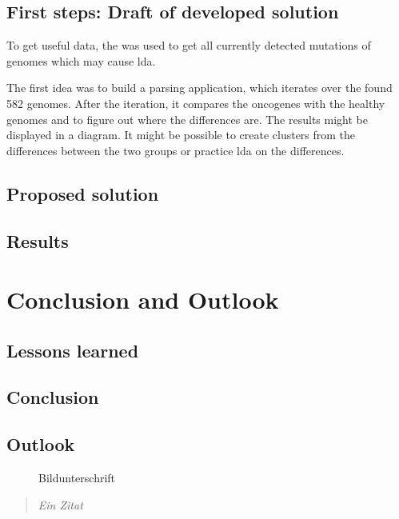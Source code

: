 \section{First steps: Draft of developed solution}\label{draft}

To get useful data, the \autocite{ncbi} was used to get all currently detected mutations of genomes which may cause \gls{lda}.

The first idea was to build a parsing application, which iterates over the found 582 genomes. After the iteration, it compares the oncogenes with the healthy genomes and to figure out where the differences are. The results might be displayed in a diagram. It might be possible to create clusters from the differences between the two groups or practice \gls{lda} on the differences.

\section{Proposed solution}\label{proposed_solution}
\section{Results}\label{results}

\chapter{Conclusion and Outlook}\label{conclusion_outlook}
\section{Lessons learned}\label{lessons_learned}
\section{Conclusion}\label{conclusion}
\section{Outlook}\label{outlook}	
	
		\begin{figure}[htbp]
			\centering
			\caption[xxx]{Bildunterschrift}
			\label{xxx}
		\end{figure}
		
		
		\begin{quote}
			\textit{Ein Zitat}
		\end{quote}


				\autocite[20]{}


\newpage






